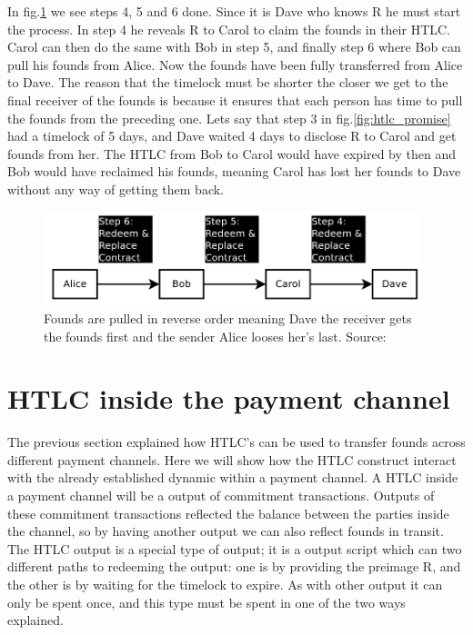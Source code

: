 \documentclass[informationsecurity]{gucmasterproject}
\begin{document}
In fig.\ref{fig:htlc_settle} we see steps 4, 5 and 6 done. Since it is Dave who knows R he must start the process. In step 4 he reveals R to Carol to claim the founds in their HTLC. Carol can then do the same with Bob in step 5, and finally step 6 where Bob can pull his founds from Alice.
Now the founds have been fully transferred from Alice to Dave.
The reason that the timelock must be shorter the closer we get to the final receiver of the founds is because it ensures that each person has time to pull the founds from the preceding one. Lets say that step 3 in fig.\ref{fig:htlc_promise} had a timelock of 5 days, and Dave waited 4 days to disclose R to Carol and get founds from her. The HTLC from Bob to Carol would have expired by then and Bob would have reclaimed his founds, meaning Carol has lost her founds to Dave without any way of getting them back.

\begin{figure}[h]
    \centering
    \includegraphics[width=11cm]{figs/htlc_settle.png}
    \caption{ Founds are pulled in reverse order meaning Dave the receiver gets the founds first and the sender Alice looses her's last. Source: \cite{poon2015bitcoin}}
    \label{fig:htlc_settle}
\end{figure}


\section{HTLC inside the payment channel}
The previous section explained how HTLC's can be used to transfer founds across different payment channels.
Here we will show how the HTLC construct interact with the already established dynamic within a payment channel.
A HTLC inside a payment channel will be a output of commitment transactions. Outputs of these commitment transactions reflected the balance between the parties inside the channel, so by having another output we can also reflect founds in transit. The HTLC output is a special type of output; it is a output script which can two different paths to redeeming the output: one is by providing the preimage R, and the other is by waiting for the timelock to expire. As with other output it can only be spent once, and this type must be spent in one of the two ways explained.
\end{document}
